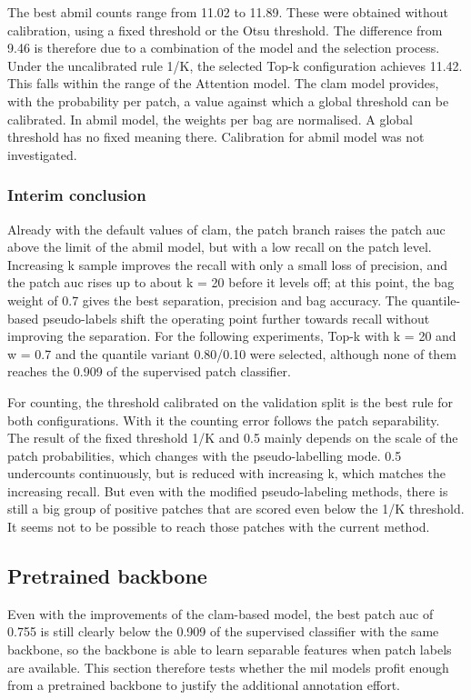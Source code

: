 \documentclass[12pt,parskip = half, DIV=classic,listof=totoc]{scrartcl}
\begin{document}
			The best \ac{abmil} counts range from 11.02 to
			11.89. These were obtained without calibration, using a fixed threshold or the Otsu threshold. The
			difference from 9.46 is therefore due to a combination of the model and the selection process. Under the uncalibrated rule
			1/K, the selected Top-k configuration achieves 11.42. This falls within the range of the
			Attention model. The \ac{clam} model provides, with the probability per patch, a
			value against which a global threshold can be calibrated. In \ac{abmil} model,
			the weights per bag are normalised. A global threshold has no fixed meaning there.
			Calibration for \ac{abmil} model was not investigated.

			\subsubsection{Interim conclusion}
			Already with the default values of \ac{clam}, the patch branch raises the patch \ac{auc} 
			above the limit of the \ac{abmil} model, but with a low recall on the patch level. 
			Increasing k sample improves the recall with only a small loss of precision, 
			and the patch \ac{auc} rises up to about k = 20 before it levels off; at this point, 
			the bag weight of 0.7 gives the best separation, precision and bag accuracy. 
			The quantile-based pseudo-labels shift the operating point further towards recall 
			without improving the separation. For the following experiments, Top-k with k = 20 
			and w = 0.7 and the quantile variant 0.80/0.10 were selected, although none of them 
			reaches the 0.909 of the supervised patch classifier.

			For counting, the threshold calibrated on the validation split is the best rule for 
			both configurations. With it the counting error follows the patch separability. 
			The result of the fixed threshold 1/K and 0.5 mainly depends on the scale 
			of the patch probabilities, which changes with the pseudo-labelling mode. 0.5 undercounts continuously, 
			but is reduced with increasing k, which matches the increasing recall. But even with 
			the modified pseudo-labeling methods, there is still a big group of positive patches that are scored even below 
			the 1/K threshold. It seems not to be possible to reach those patches with the current method.
			

			\subsection{Pretrained backbone}\label{sec:pretrain_backbone}
			Even with the improvements of the \acs*{clam}-based model, the best patch \ac{auc} of 0.755 is 
			still clearly below the 0.909 of the supervised classifier with the same backbone, 
			so the backbone is able to learn separable features when patch labels are available.
			This section therefore tests whether the \ac{mil} models 
			profit enough from a pretrained backbone to justify the additional annotation effort.
\end{document}
